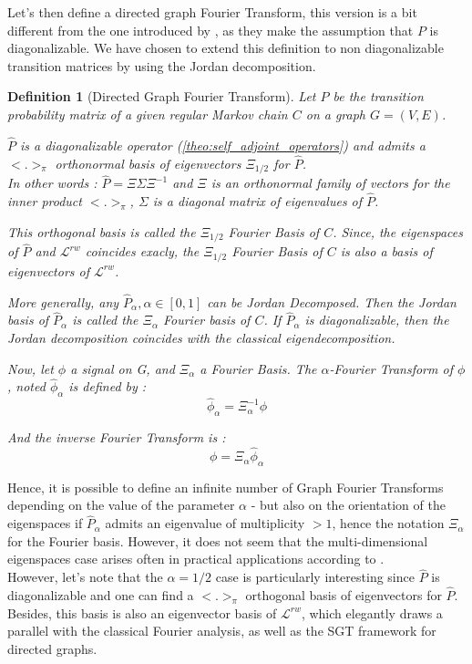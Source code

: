 \documentclass{article}
\newtheorem{definition}{Definition}[section]
\begin{document}
Let's then define a directed graph Fourier Transform, this version is a bit different from the one introduced by \cite{sevi2019}, as they make the assumption that $P$ is diagonalizable. We have chosen to extend this definition to non diagonalizable transition matrices by using the Jordan decomposition.

\begin{definition}[Directed Graph Fourier Transform]\label{def:directed_graph_fourier_transform}
Let $P$ be the transition probability matrix of a given regular Markov chain $C$ on a graph $G=(V,E)$. 

$\hat{P}$ is a diagonalizable operator (\ref{theo:self_adjoint_operators}) and admits a $<.>_{\pi}$ orthonormal basis of eigenvectors $\Xi_{1/2}$ for $\hat{P}$.\\
In other words : $\hat{P} = \Xi \Sigma \Xi^{-1}$ and $\Xi$ is an orthonormal family of vectors for the inner product $<.>_{\pi}$, $\Sigma$ is a diagonal matrix of eigenvalues of $\hat{P}$.

This orthogonal basis is called the $\Xi_{1/2}$ Fourier Basis of $C$. Since, the eigenspaces of $\hat{P}$ and $\mathcal{L}^{rw}$ coincides exacly, the $\Xi_{1/2}$ Fourier Basis of $C$ is also a basis of eigenvectors of $\mathcal{L}^{rw}$.

More generally, any $\hat{P}_\alpha, \alpha \in [0,1]$ can be Jordan Decomposed. Then the Jordan basis of $\hat{P}_\alpha$ is called the $\Xi_\alpha$ Fourier basis of $C$. If $\hat{P}_\alpha$ is diagonalizable, then the Jordan decomposition coincides with the classical eigendecomposition. 

Now, let $\phi$ a signal on G, and $\Xi_\alpha$ a Fourier Basis. The $\alpha$-Fourier Transform of $\phi$, noted $\hat{\phi}_\alpha$ is defined by :
\begin{equation}
    \hat{\phi}_\alpha = \Xi_\alpha^{-1} \phi
\end{equation}

And the inverse Fourier Transform is :
\begin{equation}
    \phi = \Xi_\alpha \hat{\phi}_\alpha
\end{equation}

\end{definition}

Hence, it is possible to define an infinite number of Graph Fourier Transforms depending on the value of the parameter $\alpha$ - but also on the orientation of the eigenspaces if $\hat{P}_\alpha$ admits an eigenvalue of multiplicity $>1$, hence the notation $\Xi_\alpha$ for the Fourier basis. However, it does not seem that the multi-dimensional eigenspaces case arises often in practical applications according to \cite{sevi2019}.\\
However, let's note that the $\alpha = 1/2$ case is particularly interesting since $\hat{P}$ is diagonalizable and one can find a $<.>_{\pi}$ orthogonal basis of eigenvectors for $\hat{P}$. Besides, this basis is also an eigenvector basis of $\mathcal{L}^{rw}$, which elegantly draws a parallel with the classical Fourier analysis, as well as the SGT framework for directed graphs.
\end{document}
